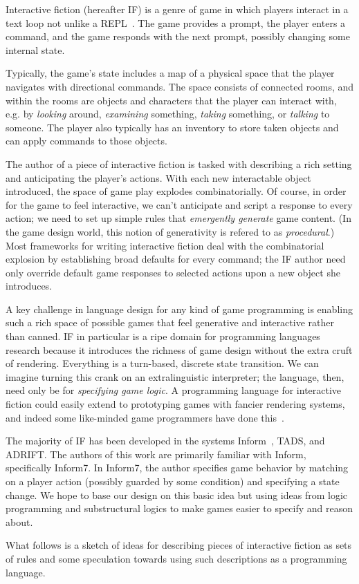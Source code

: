 Interactive fiction (hereafter IF) is a genre of game in which players
interact in a text loop not unlike a
REPL~\cite{Montfort:2004:TLP:940352}. The game provides a prompt, the
player enters a command, and the game responds with the next prompt,
possibly changing some internal state.

Typically, the game's state includes a map of a physical space that the
player navigates with directional commands. The space consists of connected
rooms, and within the rooms are objects and characters that the player can
interact with, e.g. by {\em looking} around, {\em examining} something, 
{\em taking} something, or {\em talking} to someone. The player also
typically has an inventory to store taken objects and can apply commands to
those objects.

The author of a piece of interactive fiction is tasked with describing a
rich setting and anticipating the player's actions.  With each new
interactable object introduced, the space of game play explodes
combinatorially. Of course, in order for the game to feel interactive, we
can't anticipate and script a response to every action; we need to set up
simple rules that {\em emergently generate} game content.  (In the game
design world, this notion of generativity is refered to as {\em
procedural}.) Most frameworks for writing interactive fiction deal with the
combinatorial explosion by establishing broad defaults for every command;
the IF author need only override default game responses to selected actions
upon a new object she introduces.

A key challenge in language design for any kind of game programming is
enabling such a rich space of possible games that feel generative and
interactive rather than canned.  IF in particular is a ripe domain for
programming languages research because it introduces the richness of game
design without the extra cruft of rendering. Everything is a turn-based,
discrete state transition. We can imagine turning this crank on an
extralinguistic interpreter; the language, then, need only be for {\em
specifying game logic}. A programming language for interactive fiction could
easily extend to prototyping games with fancier rendering systems, and
indeed some like-minded game programmers have done this~\cite{smith-mine-ore-2009}.

The majority of IF has been developed in the systems Inform~\cite{Nelson2005}, TADS,
and ADRIFT. The authors of this work are primarily familiar with Inform,
specifically Inform7. In Inform7, the author specifies game behavior by
matching on a player action (possibly guarded by some condition) and
specifying a state change. We hope to base our design on this basic idea
but using ideas from logic programming and substructural logics to make
games easier to specify and reason about.

What follows is a sketch of ideas for describing pieces of interactive
fiction as sets of rules and some speculation towards using such
descriptions as a programming language.
